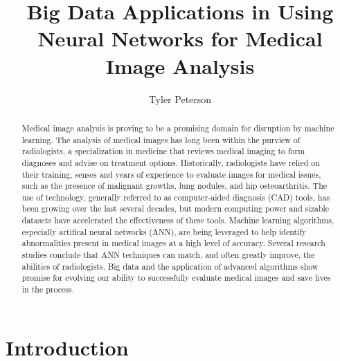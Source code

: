 \documentclass[sigconf]{acmart}
\begin{document}
\title{Big Data Applications in Using Neural Networks for Medical Image Analysis}

\author{Tyler Peterson}

\renewcommand{\shortauthors}{G. v. Laszewski}

\begin{abstract}
  
  Medical image analysis is proving to be a promising domain for disruption by machine learning. The analysis of medical images has long been within the purview of radiologists, a specialization in medicine that reviews medical imaging to form diagnoses and advise on treatment options. Historically, radiologists have relied on their training, senses and years of experience to evaluate images for medical issues, such as the presence of malignant growths, lung nodules, and hip osteoarthritis. The use of technology, generally referred to as computer-aided diagnosis (CAD) tools, has been growing over the last several decades, but modern computing power and sizable datasets have accelerated the effectiveness of these tools. Machine learning algorithms, especially artifical neural networks (ANN), are being leveraged to help identify abnormalities present in medical images at a high level of accuracy. Several research studies conclude that ANN techniques can match, and often greatly improve, the abilities of radiologists. Big data and the application of advanced algorithms show promise for evolving our ability to successfully evaluate medical images and save lives in the process.
\end{abstract}


\maketitle

\section{Introduction}
\end{document}
